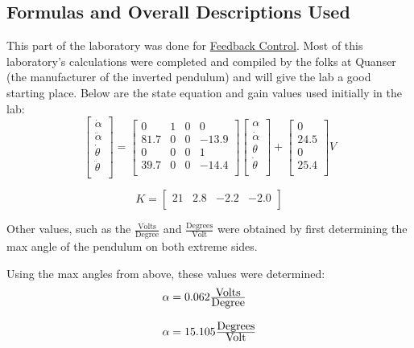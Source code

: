 \begin{CJK}
\subsection{Formulas and Overall Descriptions Used}
This part of the laboratory was done for \href{http://www.byui.edu/catalog/2004-2005/class.asp1075.htm}{Feedback Control}.  Most of this laboratory's calculations were completed and compiled by the folks at Quanser (the manufacturer of the inverted pendulum) and will give the lab a good starting place.  Below are the state equation and gain values used initially in the lab:
	\[
	\begin{bmatrix}
	\dot{\alpha} \\
	\ddot{\alpha} \\
	\dot{\theta} \\
	\ddot{\theta} \\
	\end{bmatrix}
	=
	\begin{bmatrix}
	0 & 1 & 0 & 0 \\
	81.7 & 0 & 0 & -13.9 \\
	0 & 0 & 0 & 1 \\
	39.7 & 0 & 0 & -14.4 \\
	\end{bmatrix}
	\begin{bmatrix}
	\alpha \\
	\dot{\alpha} \\
	\theta \\
	\dot{\theta} \\
	\end{bmatrix}
	+
	\begin{bmatrix}
	0 \\
	24.5 \\
	0 \\
	25.4 \\
	\end{bmatrix}
	V
	\]

	\[
	K  =
	\begin{bmatrix}
	21 & 2.8 & -2.2 & -2.0 \\
	\end{bmatrix}
	\]

Other values, such as the $\frac{\mbox{Volts}}{\mbox{Degree}}$ and $\frac{\mbox{Degrees}}{\mbox{Volt}}$ were obtained by first determining the max angle of the pendulum on both extreme sides.

Using the max angles from above, these values were determined:
	\[
	\begin{array}{l l}
		\alpha = 0.062 \frac{\mbox{Volts}}{\mbox{Degree}} \\ \\
		\alpha = 15.105 \frac{\mbox{Degrees}}{\mbox{Volt}} \\
	\end{array}
	\]


\end{CJK}
